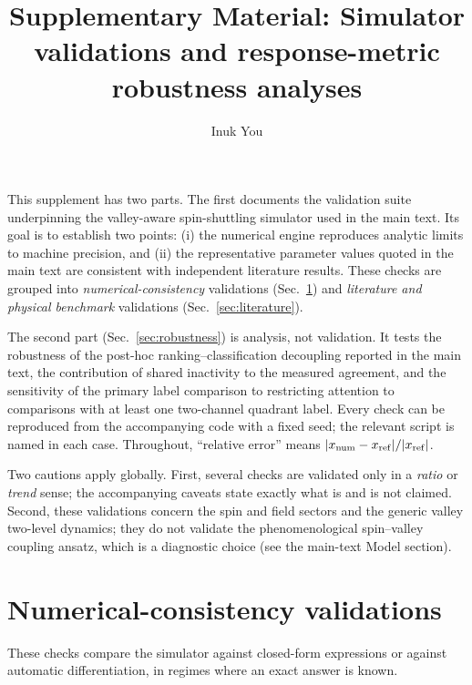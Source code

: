 \documentclass[aip,jap,reprint,onecolumn,superscriptaddress,longbibliography]{revtex4-2}
\begin{document}
\title{Supplementary Material: Simulator validations and
response-metric robustness analyses}

\author{Inuk You}

\maketitle

This supplement has two parts. The first documents the validation suite
underpinning the valley-aware spin-shuttling simulator used in the main text.
Its goal is to establish two points: (i) the numerical engine reproduces
analytic limits to machine precision, and (ii) the representative parameter
values quoted in the main text are consistent with independent literature
results. These checks
are grouped into \emph{numerical-consistency} validations
(Sec.~\ref{sec:numerics}) and \emph{literature and physical benchmark}
validations (Sec.~\ref{sec:literature}).

The second part (Sec.~\ref{sec:robustness}) is analysis, not validation. It
tests the robustness of the post-hoc ranking--classification decoupling
reported in the main text, the contribution of shared inactivity to the
measured agreement, and the sensitivity of the primary label comparison to
restricting attention to comparisons with at least one two-channel quadrant
label.
Every check can be reproduced from the accompanying code with a fixed seed;
the relevant script is named in each case. Throughout, ``relative
error'' means $|x_{\rm num}-x_{\rm ref}|/|x_{\rm ref}|$.

Two cautions apply globally. First, several checks are validated only
in a \emph{ratio} or \emph{trend} sense; the accompanying caveats state
exactly what is and is not claimed. Second, these validations concern
the spin and field sectors and the generic valley two-level dynamics;
they do not validate the phenomenological spin--valley coupling
ansatz, which is a diagnostic choice (see the main-text Model section).

\section{Numerical-consistency validations}
\label{sec:numerics}

These checks compare the simulator against closed-form expressions or
against automatic differentiation, in regimes where an exact answer is
known.
\end{document}
